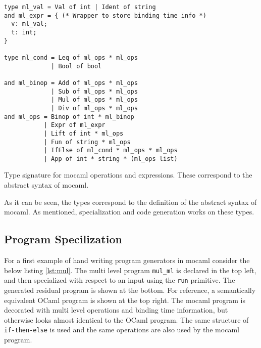 \begin{listing}[H]
\begin{verbatim}
type ml_val = Val of int | Ident of string
and ml_expr = { (* Wrapper to store binding time info *)
  v: ml_val;
  t: int;
}

type ml_cond = Leq of ml_ops * ml_ops
             | Bool of bool

and ml_binop = Add of ml_ops * ml_ops
             | Sub of ml_ops * ml_ops
             | Mul of ml_ops * ml_ops
             | Div of ml_ops * ml_ops
and ml_ops = Binop of int * ml_binop
           | Expr of ml_expr
           | Lift of int * ml_ops
           | Fun of string * ml_ops
           | IfElse of ml_cond * ml_ops * ml_ops
           | App of int * string * (ml_ops list)
\end{verbatim}
\caption{Type signature for mocaml operations and expressions. These correspond to the abstract syntax of mocaml.}
\label{lst:dsl}
\end{listing}

As it can be seen, the types correspond to the definition of the abstract syntax of mocaml. As mentioned, specialization and code generation works on these types.

\subsection{Program Specilization}

For a first example of hand writing program generators in mocaml consider the below listing \ref{lst:mul}. The multi level program \texttt{mul\_ml} is declared in the top left, and then specialized with respect to an input using the \texttt{run} primitive. The generated residual program is shown at the bottom. For reference, a semantically equivalent OCaml program is shown at the top right. The mocaml program is decorated with multi level operations and binding time information, but otherwise looks almost identical to the OCaml program. The same structure of \texttt{if-then-else} is used and the same operations are also used by the mocaml program.

